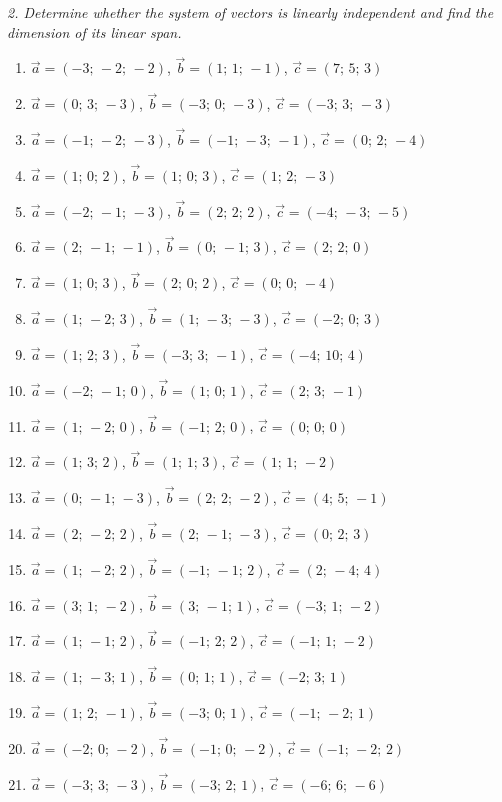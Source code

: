 \emph{2. Determine whether the system of vectors is linearly independent and find the dimension of its linear span.}
\bigskip
\begin{enumerate}[label=\arabic*., leftmargin=*]
\item $\vec a=(-3;\,-2;\,-2)$, $\vec b=(1;\,1;\,-1)$, $\vec c=(7;\,5;\,3)$
\item $\vec a=(0;\,3;\,-3)$, $\vec b=(-3;\,0;\,-3)$, $\vec c=(-3;\,3;\,-3)$
\item $\vec a=(-1;\,-2;\,-3)$, $\vec b=(-1;\,-3;\,-1)$, $\vec c=(0;\,2;\,-4)$
\item $\vec a=(1;\,0;\,2)$, $\vec b=(1;\,0;\,3)$, $\vec c=(1;\,2;\,-3)$
\item $\vec a=(-2;\,-1;\,-3)$, $\vec b=(2;\,2;\,2)$, $\vec c=(-4;\,-3;\,-5)$
\item $\vec a=(2;\,-1;\,-1)$, $\vec b=(0;\,-1;\,3)$, $\vec c=(2;\,2;\,0)$
\item $\vec a=(1;\,0;\,3)$, $\vec b=(2;\,0;\,2)$, $\vec c=(0;\,0;\,-4)$
\item $\vec a=(1;\,-2;\,3)$, $\vec b=(1;\,-3;\,-3)$, $\vec c=(-2;\,0;\,3)$
\item $\vec a=(1;\,2;\,3)$, $\vec b=(-3;\,3;\,-1)$, $\vec c=(-4;\,10;\,4)$
\item $\vec a=(-2;\,-1;\,0)$, $\vec b=(1;\,0;\,1)$, $\vec c=(2;\,3;\,-1)$
\item $\vec a=(1;\,-2;\,0)$, $\vec b=(-1;\,2;\,0)$, $\vec c=(0;\,0;\,0)$
\item $\vec a=(1;\,3;\,2)$, $\vec b=(1;\,1;\,3)$, $\vec c=(1;\,1;\,-2)$
\item $\vec a=(0;\,-1;\,-3)$, $\vec b=(2;\,2;\,-2)$, $\vec c=(4;\,5;\,-1)$
\item $\vec a=(2;\,-2;\,2)$, $\vec b=(2;\,-1;\,-3)$, $\vec c=(0;\,2;\,3)$
\item $\vec a=(1;\,-2;\,2)$, $\vec b=(-1;\,-1;\,2)$, $\vec c=(2;\,-4;\,4)$
\item $\vec a=(3;\,1;\,-2)$, $\vec b=(3;\,-1;\,1)$, $\vec c=(-3;\,1;\,-2)$
\item $\vec a=(1;\,-1;\,2)$, $\vec b=(-1;\,2;\,2)$, $\vec c=(-1;\,1;\,-2)$
\item $\vec a=(1;\,-3;\,1)$, $\vec b=(0;\,1;\,1)$, $\vec c=(-2;\,3;\,1)$
\item $\vec a=(1;\,2;\,-1)$, $\vec b=(-3;\,0;\,1)$, $\vec c=(-1;\,-2;\,1)$
\item $\vec a=(-2;\,0;\,-2)$, $\vec b=(-1;\,0;\,-2)$, $\vec c=(-1;\,-2;\,2)$
\item $\vec a=(-3;\,3;\,-3)$, $\vec b=(-3;\,2;\,1)$, $\vec c=(-6;\,6;\,-6)$

\end{enumerate}
